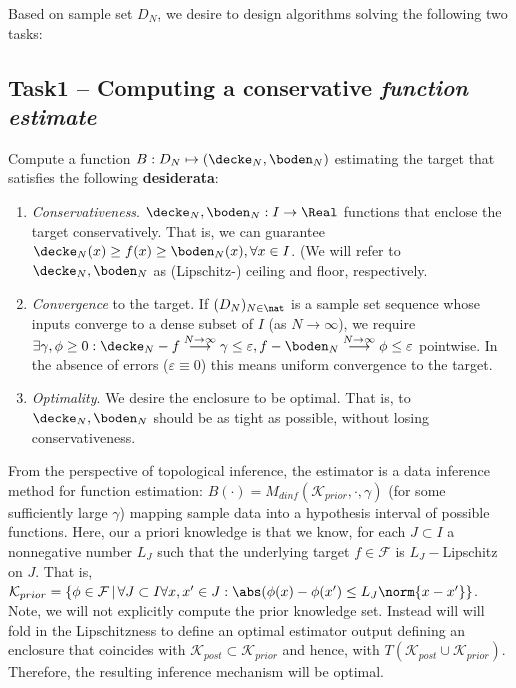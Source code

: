  Based on sample set $D_N$, we desire to design algorithms solving the following two
tasks:

\subsection{Task1 -- Computing a conservative \textit{function estimate}}
\label{sec:problemdef_task1}
Compute a function $B: D_N \mapsto (\decke_N,\boden_N)$ estimating the target that satisfies the following \textbf{desiderata}:
\begin{enumerate}
	\item \textit{Conservativeness}. $\decke_N, \boden_N :I \to \Real$ functions that enclose the target conservatively. That is, 
			we can guarantee  $\decke_N(x) \geq f(x) \geq \boden_N(x), \forall x \in I$. (We will refer to $\decke_N, \boden_N$ as (Lipschitz-) ceiling and floor, respectively. 
				\item \textit{Convergence} to the target. If $(D_N)_{N \in \nat }$ is a sample set sequence whose inputs converge to a dense subset of $I$ (as $N \to \infty$), we require $\exists \gamma, \phi \geq 0: \decke_N - f \stackrel{N \to \infty} \longrightarrow \gamma \leq \varepsilon, f- \boden_N \stackrel{N \to \infty} \longrightarrow \phi \leq \varepsilon$ pointwise. In the absence of errors ($\varepsilon \equiv 0$) this means uniform convergence to the target.
				\item \textit{Optimality}. We desire the enclosure to be optimal. That is, to $\decke_N, \boden_N$ should be as tight as possible, without losing conservativeness.
\end{enumerate}

From the perspective of topological inference, the estimator is a data inference method for function estimation:
$B(\cdot) = M_{dinf}(\mathcal K_{prior}, \cdot, \gamma ) $ (for some sufficiently large $\gamma$) mapping sample data into a hypothesis interval of possible functions. 
Here,  our a priori knowledge is that we know, for each $J \subset I$ a nonnegative number $L_J$ such that the underlying target $f \in \mathcal F$ is $L_J-$Lipschitz on $J$. That is, $\mathcal K_{prior} =\{\phi \in \mathcal F \,|\, \forall J \subset I \forall x,x' \in J: \abs(\phi(x) - \phi(x') \leq L_J \norm{x-x'}\}$. 
Note, we will not explicitly compute the prior knowledge set. Instead will will fold in the Lipschitzness to define an optimal estimator output defining an enclosure that coincides with $\mathcal K_{post} \subset \mathcal K_{prior}$ and hence, with $T (\mathcal K_{post} \cup \mathcal K_{prior})$. Therefore, the resulting inference mechanism will be optimal. 

